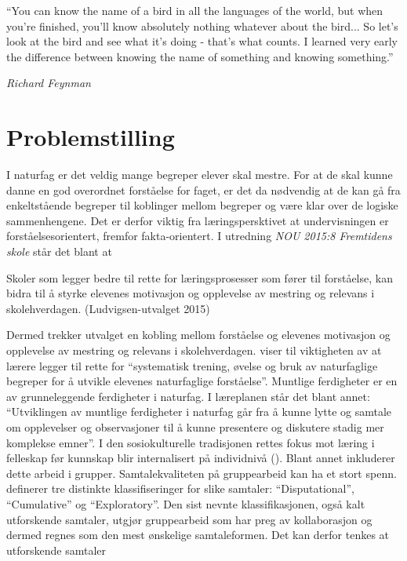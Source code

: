 \documentclass[main.tex]{subfiles}
\begin{document}
\setlength{\epigraphwidth}{0.8\textwidth}
\epigraph{``You can know the name of a bird in all the languages of the world, 
but when you're finished, you'll know absolutely nothing whatever about the bird...
So let's look at the bird and see what it’s doing - that's what counts. I learned 
very early the difference between knowing the name of something and knowing something.''}
{\textit{Richard Feynman}}

\section*{Problemstilling}

I naturfag er det veldig mange begreper elever skal mestre. For at de skal kunne danne en god 
overordnet forståelse for faget, er det da nødvendig at de kan gå fra enkeltstående begreper til 
koblinger mellom begreper og være klar over de logiske sammenhengene. Det er derfor viktig fra 
læringspersktivet at undervisningen er forståelsesorientert, fremfor fakta-orientert. I utredning
\emph{NOU 2015:8 Fremtidens skole} står det blant at
\begin{displayquote}
Skoler som legger bedre til rette for læringsprosesser som fører til forståelse, kan bidra til å 
styrke elevenes motivasjon og opplevelse av mestring og relevans i skolehverdagen. 
(Ludvigsen-utvalget 2015)
\end{displayquote}
Dermed trekker utvalget en kobling mellom forståelse og elevenes motivasjon og opplevelse av
mestring og relevans i skolehverdagen.  viser til viktigheten av at 
lærere legger til rette for ``systematisk trening, øvelse og bruk av naturfaglige begreper 
for å utvikle elevenes naturfaglige forståelse''. Muntlige ferdigheter er en av grunneleggende 
ferdigheter i naturfag. I læreplanen står det blant annet: ``Utviklingen av muntlige ferdigheter 
i naturfag går fra å kunne lytte og samtale om opplevelser og observasjoner til å kunne presentere 
og diskutere stadig mer komplekse emner''. I den sosiokulturelle tradisjonen rettes 
fokus mot læring i felleskap før kunnskap blir internalisert på individnivå (). 
Blant annet inkluderer dette arbeid i grupper. Samtalekvaliteten på gruppearbeid kan ha et stort spenn. 
 definerer tre distinkte klassifiseringer for slike samtaler:
``Disputational'', ``Cumulative'' og ``Exploratory''. Den sist nevnte klassifikasjonen,
også kalt utforskende samtaler, utgjør gruppearbeid som har preg av kollaborasjon og dermed 
regnes som den mest ønskelige samtaleformen. Det kan derfor tenkes at utforskende samtaler 
\end{document}
